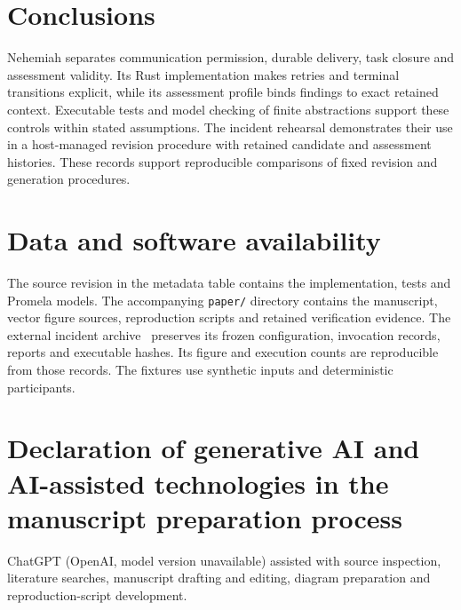 \documentclass[preprint,12pt,a4paper]{elsarticle}
\newcommand{\code}[1]{\texttt{#1}}
\begin{document}
\section{Conclusions}
Nehemiah separates communication permission, durable delivery, task closure and assessment validity. Its Rust implementation makes retries and terminal transitions explicit, while its assessment profile binds findings to exact retained context. Executable tests and model checking of finite abstractions support these controls within stated assumptions. The incident rehearsal demonstrates their use in a host-managed revision procedure with retained candidate and assessment histories. These records support reproducible comparisons of fixed revision and generation procedures.

\section*{Data and software availability}
The source revision in the metadata table contains the implementation, tests and Promela models. The accompanying \code{paper/} directory contains the manuscript, vector figure sources, reproduction scripts and retained verification evidence. The external incident archive~\citep{incidentRevision} preserves its frozen configuration, invocation records, reports and executable hashes. Its figure and execution counts are reproducible from those records. The fixtures use synthetic inputs and deterministic participants.

\section*{Declaration of generative AI and AI-assisted technologies in the manuscript preparation process}
ChatGPT (OpenAI, model version unavailable) assisted with source inspection, literature searches, manuscript drafting and editing, diagram preparation and reproduction-script development.



\end{document}
